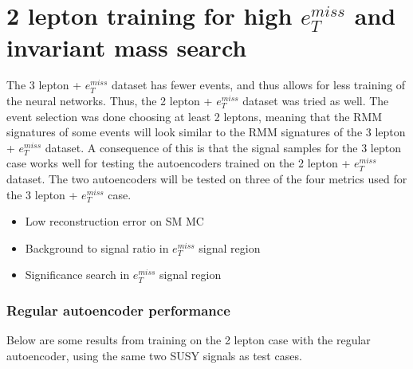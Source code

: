 
\section{2 lepton training for high $e_T^{miss}$ and invariant mass search}\label{sec:2lep}

The 3 lepton + $e_T^{miss}$ dataset has fewer events, and thus allows for less training of the neural networks. 
Thus, the 2 lepton + $e_T^{miss}$ dataset was tried as well. The event selection was done choosing at least 
2 leptons, meaning that the RMM signatures of some events will look similar to the RMM signatures of 
the 3 lepton + $e_T^{miss}$ dataset. A consequence of this is that the signal samples for the 3 lepton case 
works well for testing the autoencoders trained on the 2 lepton + $e_T^{miss}$ dataset. The two autoencoders will be tested on three of the 
four metrics used for the 3 lepton + $e_T^{miss}$ case. 
\begin{itemize}
    \item Low reconstruction error on SM MC
    \item Background to signal ratio in $e_T^{miss}$ signal region
    \item Significance search in $e_T^{miss}$ signal region
\end{itemize}

\subsubsection*{Regular autoencoder performance}
Below are some results from training on the 2 lepton case with the regular autoencoder, using the same two SUSY signals as test cases. 

